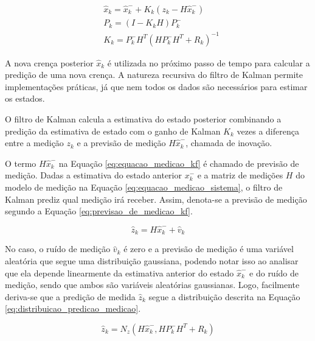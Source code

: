 \documentclass[acronym, symbols, table, deposito]{fei}
\begin{document}
				\begin{equation} \label{eq:equacao_medicao_kf}
					\begin{split}
						&\hat{x}_{k} = \hat{x}_{k}^{-} + K_{k}(z_k - H\hat{x}_{k}^{-}) \\
						&P_{k} = (I - K_kH)P_{k}^{-} \\
						&K_k =  P_{k}^{-}H^T(HP_{k}^{-}H^T + R_k)^{-1}
					\end{split}
				\end{equation}
			
				A nova crença posterior $\hat{x}_{k}$ é utilizada no próximo passo de tempo para calcular a predição de uma nova crença. A natureza recursiva do filtro de Kalman permite implementações práticas, já que nem todos os dados são necessários para estimar os estados.
				
				O filtro de Kalman calcula a estimativa do estado posterior combinando a predição da estimativa de estado com o ganho de Kalman $K_k$ vezes a diferença entre a medição $z_k$ e a previsão de medição $H\hat{x}_{k}^{-}$, chamada de inovação.
				
				O termo $H\hat{x}_{k}^{-}$ na Equação \eqref{eq:equacao_medicao_kf} é chamado de previsão de medição. Dadas a estimativa do estado anterior ${x}_{k}^{-}$ e a matriz de medições $H$ do modelo de medição na Equação \eqref{eq:equacao_medicao_sistema}, o filtro de Kalman prediz qual medição irá receber. Assim, denota-se a previsão de medição segundo a Equação \eqref{eq:previsao_de_medicao_kf}.
				
				\begin{equation} \label{eq:previsao_de_medicao_kf}
					\hat{z}_k = H\hat{x}_{k}^{-} + \hat{v}_k
				\end{equation}
			
				No caso, o ruído de medição $\hat{v}_k$ é zero e a previsão de medição é uma variável aleatória que segue uma distribuição gaussiana, podendo notar isso ao analisar que ela depende linearmente da estimativa anterior do estado $\hat{x}_{k}^{-}$ e do ruído de medição, sendo que ambos são variáveis aleatórias gaussianas. Logo, facilmente deriva-se que a predição de medida $\hat{z}_k$ segue a distribuição descrita na Equação \eqref{eq:distribuicao_predicao_medicao}.
				
				\begin{equation} \label{eq:distribuicao_predicao_medicao}
					\hat{z}_k = N_z( H\hat{x}_{k}^{-}, HP_{k}^{-}H^T + R_k)
				\end{equation}
			
\end{document}
